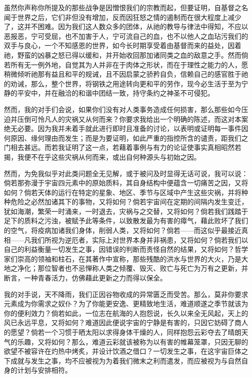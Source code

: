 虽然你声称你所提及的那些战争是因憎恨我们的宗教而起，但要证明，自基督之名闻于世界之后，它们非但没有增加，反而因狂怒之情的遏制而在很大程度上减少了，这并不困难。因为我们这人数众多的团体，从祂的教导与律法中得知，不应以恶报恶，宁可受屈，也不加害于人，宁可流自己的血，也不以他人之血玷污我们的双手与良心，一个不知感恩的世界，如今长时期享受着由基督而来的益处，因着祂，野蛮的凶暴之怒已得以缓和，并开始收回那加诸同类之血的敌意之手。然而倘若所有无一例外地，自觉其为人并非在于肉体之形状，而在于理性之能力的人，愿稍微倾听祂那有益且和平的规诫，且不因启蒙之骄矜自负，信赖自己的感官胜于祂的劝诫，那么，整个世界，将钢铁之用途转向更和平的劳作，现今必生活于至为宁静的平安中，并在融洽的和谐中团结一致，持守条约之神圣不可侵犯。\par

然而，我的对手们会说，如果你们没有对人类事务造成任何损害，那么那些如今压迫并压倒可怜凡人的灾祸又从何而来？你要求我给出一个明确的陈述，而这对本案绝无必要。因为我并未着手就此进行即时且准备的讨论，以表明或证明每一事件因何原因、缘何理由而发生；而是为要证明，如此严重的指控所含的谴责，距我们之门相去甚远。而若我证明了这一点，若藉着事例与有力的论证使事实真相昭然若揭，我便不在乎这些灾祸从何而来，或出自何种源头与初始之因。\par

然而，为免我似乎对此类问题全无见解，或于被问及时显得无话可说，我可以说：倘若那弥漫于宇宙四元素中的原始质料，其自身结构中便蕴含一切痛苦之因，又将如何？倘若天体的运行在特定的星象、地区、季节与区域中产生这些灾祸，并将种种危险之必然加诸其下的事物，又将如何？倘若宇宙间在定期的间隔内发生变迁，犹如海潮，繁荣一时涌来，一时退去，灾祸与之交替，又将如何？倘若我们践踏于足下的质料之污浊，被赋予此等条件，以致散发最为有害的瘴气，藉此败坏了我们的空气，将疫病加诸我们身体，削弱人类，又将如何？倘若——而这似乎最接近真相——凡我们所视为逆厄者，实际上对世界本身并非祸患，又将如何？倘若我们以自己的利益衡量一切发生之事，因错误的判断而责怪自然的结果，又将如何？哲学家们崇高的领袖和柱石，在其著作中宣称，那些残酷的洪水与世界的大火，乃是大地之净化；那位智者也不忌惮称人类之倾覆、毁灭、败亡与死亡为万有之更新，并断言，一种青春活力，仿佛藉此更新之力而得以保全。\par

我的对手说，天不降雨，我们正因谷物收成的异常匮乏而受苦。那么，莫非你要求元素成为你需求之奴仆？为了你能更安逸、更精致地生活，难道顺遂之季节就该为你的便利效力？倘若如此，一位志在航海的人抱怨说，长久以来全无风起，天上的风已永远平息，又将如何？难道因此便说宇宙的宁静是有害的，只因它妨碍了商人的愿望？倘若一个习惯于晒太阳以求得身体干燥的人，同样抱怨云彩夺去了晴朗天气的乐趣，又将如何？那么，难道云彩就该被称为以有害的帷幕笼罩，只因无聊的欲望不被容许在灼热中烤炙，并设计饮酒之借口？一切发生之事，在这宇宙巨体之下成就与发生之事，均不应被视为为着我们微末之利而遣发，而应被视为与自然自身的计划与安排相符。\par

